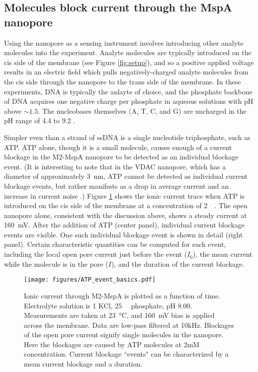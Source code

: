 \subsection{Molecules block current through the MspA nanopore}

Using the nanopore as a sensing instrument involves introducing other analyte molecules into the experiment.  Analyte molecules are typically introduced on the cis side of the membrane (see Figure \ref{fig:setup}), and so a positive applied voltage results in an electric field which pulls negatively-charged analyte molecules from the cis side through the nanopore to the trans side of the membrane.  In these experiments, DNA is typically the anlayte of choice, and the phosphate backbone of DNA acquires one negative charge per phosphate in aqueous solutions with pH above $\sim 1.5$.  The nucleobases themselves (A, T, C, and G) are uncharged in the pH range of \num{4.4} to \num{9.2} \citep{Verdolino2008, Acharya2004}.

Simpler even than a strand of ssDNA is a single nucleotide triphosphate, such as ATP.  ATP alone, though it is a small molecule, causes enough of a current blockage in the M2-MspA nanopore to be detected as an individual blockage event.  (It is interesting to note that in the VDAC nanopore, which has a diameter of approximately \SI{3}{\nm}, ATP cannot be detected as individual current blockage events, but rather manifests as a drop in average current and an increase in current noise \citep{Rostovtseva1998, Rostovtseva2002}.)  Figure \ref{fig:mspa_event_basics} shows the ionic current trace when ATP is introduced on the cis side of the membrane at a concentration of \SI{2}{\milli\Molar}.  The open nanopore alone, consistent with the discussion above, shows a steady current at \SI{160}{\mV}.  After the addition of ATP (center panel), individual current blockage events are visible.  One such individual blockage event is shown in detail (right panel).  Certain characteristic quantities can be computed for each event, including the local open pore current just before the event ($I_0$), the mean current while the molecule is in the pore ($I$), and the duration of the current blockage.

\begin{figure}[h]
\begin{centering}
\texttt{[image: figures/ATP\_event\_basics.pdf]}
\caption[Current blockage events in the MspA nanopore]{Ionic current through M2-MspA is plotted as a function of time.  Electrolyte solution is \SI{1}{\Molar} KCl, \SI{25}{\milli\Molar} phosphate, pH \num{8.00}.  Measurements are taken at \SI{23}{\degreeCelsius}, and \SI{160}{\mV} bias is applied across the membrane.  Data are low-pass filtered at 10kHz.  Blockages of the open pore current signify single molecules in the nanopore.  Here the blockages are caused by ATP molecules at 2mM concentration.  Current blockage ``events" can be characterized by a mean current blockage and a duration.}
\label{fig:mspa_event_basics}
\end{centering}
\end{figure}

